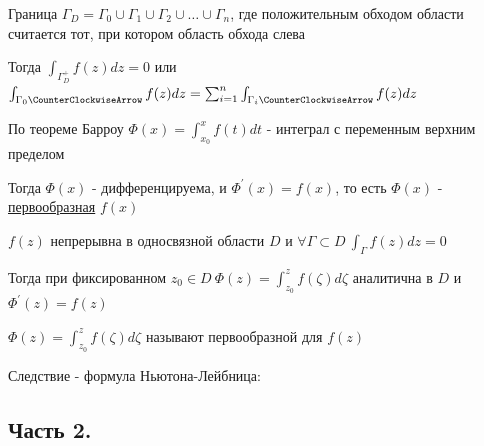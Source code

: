 \documentclass[12pt]{article}
\begin{document}
\begin{enumerate}
\begin{MyTheorem}
    
        Граница $\Gamma_D = \Gamma_0 \cup \Gamma_1 \cup \Gamma_2 \cup \dots \cup \Gamma_n$, где положительным обходом области
        считается тот, при котором область обхода слева
    
        Тогда $\int_{\Gamma_D^+} f(z) dz = 0$ или $\int_{\Gamma_0 \CounterClockwiseArrow} f(z) dz = \sum_{i = 1}^n \int_{\Gamma_i \CounterClockwiseArrow} f(z) dz$ 
    \end{MyTheorem}

    По теореме Барроу $\Phi(x) = \int_{x_0}^x f(t) dt$ - интеграл с переменным верхним пределом

    Тогда $\Phi(x)$ - дифференцируема, и $\Phi^\prime(x) = f(x)$, то есть $\Phi(x)$ - \hyperlink{antiderivative}{первообразная} $f(x)$

    \begin{MyTheorem}
        \Ths $f(z)$ непрерывна в односвязной области $D$ и $\forall \Gamma \subset D \ \int_\Gamma f(z) dz = 0$

        Тогда при фиксированном $z_0 \in D \ \Phi(z) = \int_{z_0}^z f(\zeta) d\zeta$ аналитична в $D$ и $\Phi^\prime(z) = f(z)$
    \end{MyTheorem}

    $\Phi(z) = \int_{z_0}^z f(\zeta) d\zeta$ называют первообразной для $f(z)$

    Следствие - формула Ньютона-Лейбница: 

\end{enumerate}

    

\subsection{Часть 2.}
\end{document}
